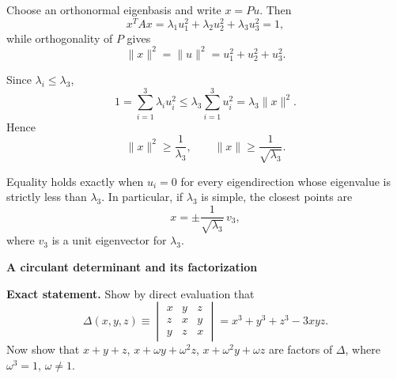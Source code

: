 \begin{solution}
Choose an orthonormal eigenbasis and write \(x=Pu\). Then
\[
x^TAx=\lambda_1u_1^2+\lambda_2u_2^2+\lambda_3u_3^2=1,
\]
while orthogonality of \(P\) gives
\[
\|x\|^2=\|u\|^2=u_1^2+u_2^2+u_3^2.
\]

Since \(\lambda_i\le\lambda_3\),
\[
1=\sum_{i=1}^3\lambda_i u_i^2
\le
\lambda_3\sum_{i=1}^3u_i^2
=
\lambda_3\|x\|^2.
\]
Hence
\[
\|x\|^2\ge\frac1{\lambda_3},
\qquad
\|x\|\ge\frac1{\sqrt{\lambda_3}}.
\]

Equality holds exactly when \(u_i=0\) for every eigendirection whose eigenvalue is strictly less
than \(\lambda_3\). In particular, if \(\lambda_3\) is simple, the closest points are
\[
x=\pm\frac1{\sqrt{\lambda_3}}\,v_3,
\]
where \(v_3\) is a unit eigenvector for \(\lambda_3\).
\end{solution}

\begin{problem}[CP-I-0025]
\label{prob:cp-i-0025}
\textbf{A circulant determinant and its factorization}

\textbf{Exact statement.}
\hspace*{1.5em}Show by direct evaluation that
\[
\Delta(x,y,z)\equiv
\begin{vmatrix}
	x&y&z\\
	z&x&y\\
	y&z&x
\end{vmatrix}
= x^3+y^3+z^3-3xyz.
\]
Now show that \(x+y+z\), \(x+\omega y+\omega^2 z\), \(x+\omega^2 y+\omega z\)
are factors of \(\Delta\), where \(\omega^3=1\), \(\omega\neq 1\).

\end{problem}


